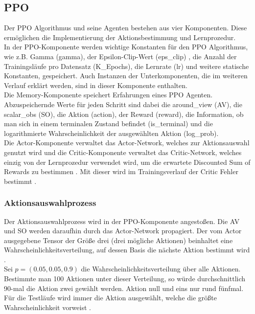 \subsection{PPO} \label{subsec:Konzept_PPO}
Der PPO Algorithmus und seine Agenten bestehen aus vier Komponenten. Diese ermöglichen die Implementierung der Aktionsbestimmung und Lernprozedur.\\
In der PPO-Komponente werden wichtige Konstanten für den PPO Algorithmus, wie z.B. Gamma (gamma), der Epsilon-Clip-Wert (eps\_clip) , die Anzahl der Trainingsläufe pro Datensatz (K\_Epochs), die Lernrate (lr) und weitere statische Konstanten, gespeichert. Auch Instanzen der Unterkomponenten, die im weiteren Verlauf erklärt werden, sind in dieser Komponente enthalten.\\
Die Memory-Komponente speichert Erfahrungen eines PPO Agenten. Abzuspeichernde Werte für jeden Schritt sind dabei die around\_view (AV), die scalar\_obs (SO), die Aktion (action), der Reward (reward), die Information, ob man sich in einem terminalen Zustand befindet (is\_terminal) und die logarithmierte Wahrscheinlichkeit der ausgewählten Aktion (log\_prob).\\
Die Actor-Komponente verwaltet das Actor-Network, welches zur Aktionsauswahl genutzt wird und die Critic-Komponente verwaltet das Critic-Network, welches einzig von der Lernprozedur verwendet wird, um die erwartete Discounted Sum of Rewards zu bestimmen . Mit dieser wird im Trainingsverlauf der Critic Fehler bestimmt .

\subsubsection{Aktionsauswahlprozess} \label{subsubsec:Konzept_Aktionsauswahlprozess_PPO}
Der Aktionsauswahlprozess wird in der PPO-Komponente angestoßen. Die AV und SO werden daraufhin durch das Actor-Network propagiert. Der vom Actor ausgegebene Tensor der Größe drei (drei mögliche Aktionen) beinhaltet eine Wahrscheinlichkeitsverteilung, auf dessen Basis die nächste Aktion bestimmt wird .\\
Sei $p = (0.05, 0.05, 0.9)$ die Wahrscheinlichkeitsverteilung über alle Aktionen. Bestimmte man 100 Aktionen unter dieser Verteilung, so würde durchschnittlich 90-mal die Aktion zwei gewählt werden. Aktion null und eins nur rund fünfmal.\\
Für die Testläufe wird immer die Aktion ausgewählt, welche die größte Wahrscheinlichkeit vorweist .

